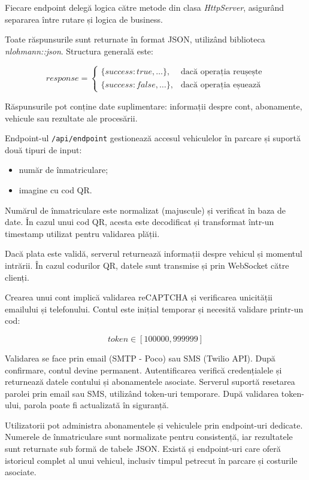 Fiecare endpoint delegă logica către metode din clasa \textit{HttpServer}, asigurând separarea între rutare și logica de business.

Toate răspunsurile sunt returnate în format JSON, utilizând biblioteca \textit{nlohmann::json}. Structura generală este:

\[
    response =
    \begin{cases}
        \{success: true, \ldots\}, & \text{dacă operația reușește} \\
        \{success: false, \ldots\}, & \text{dacă operația eșuează}
    \end{cases}
\]

Răspunsurile pot conține date suplimentare: informații despre cont, abonamente, vehicule sau rezultate ale procesării.

Endpoint-ul \texttt{/api/endpoint} gestionează accesul vehiculelor în parcare și suportă două tipuri de input:

\begin{itemize}
    \item număr de înmatriculare;
    \item imagine cu cod QR.
\end{itemize}

Numărul de înmatriculare este normalizat (majuscule) și verificat în baza de date. În cazul unui cod QR, acesta este decodificat și transformat într-un timestamp utilizat pentru validarea plății.

Dacă plata este validă, serverul returnează informații despre vehicul și momentul intrării. În cazul codurilor QR, datele sunt transmise și prin WebSocket către clienți.

Crearea unui cont implică validarea reCAPTCHA și verificarea unicității emailului și telefonului. Contul este inițial temporar și necesită validare printr-un cod:

\[
    token \in [100000, 999999]
\]

Validarea se face prin email (SMTP - Poco) sau SMS (Twilio API). După confirmare, contul devine permanent. Autentificarea verifică credențialele și returnează datele contului și abonamentele asociate. Serverul suportă resetarea parolei prin email sau SMS, utilizând token-uri temporare. După validarea token-ului, parola poate fi actualizată în siguranță.

Utilizatorii pot administra abonamentele și vehiculele prin endpoint-uri dedicate. Numerele de înmatriculare sunt normalizate pentru consistență, iar rezultatele sunt returnate sub formă de tabele JSON. Există și endpoint-uri care oferă istoricul complet al unui vehicul, inclusiv timpul petrecut în parcare și costurile asociate.

